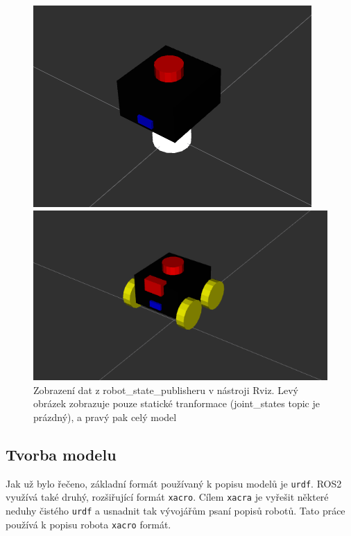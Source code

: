 \begin{figure}[h!]
	\centering
	\begin{minipage}[c]{0.45\textwidth}
		\centering
		\includegraphics[scale=0.45]{obrazky-figures/robot_description_no_joint_states.png}
	\end{minipage}%
	\begin{minipage}[c]{0.55\textwidth}
		\centering
		\includegraphics[scale=0.4]{obrazky-figures/robot_description_joint_states.png}
	\end{minipage}
	\caption[Zobrazení popisu robota v nástroji Rviz]{Zobrazení dat z robot\_state\_publisheru v nástroji Rviz. Levý obrázek zobrazuje pouze statické tranformace (joint\_states topic je prázdný), a pravý pak celý model}
	\label{fig:rviz_robot_desc}
\end{figure}

\subsection*{Tvorba modelu}
Jak už bylo řečeno, základní formát používaný k popisu modelů je \verb|urdf|. ROS2 využívá také druhý, rozšiřující formát \verb|xacro|. Cílem \verb|xacra| je vyřešit některé neduhy čistého \verb|urdf| a usnadnit tak vývojářům psaní popisů robotů. Tato práce používá k popisu robota \verb|xacro| formát.

